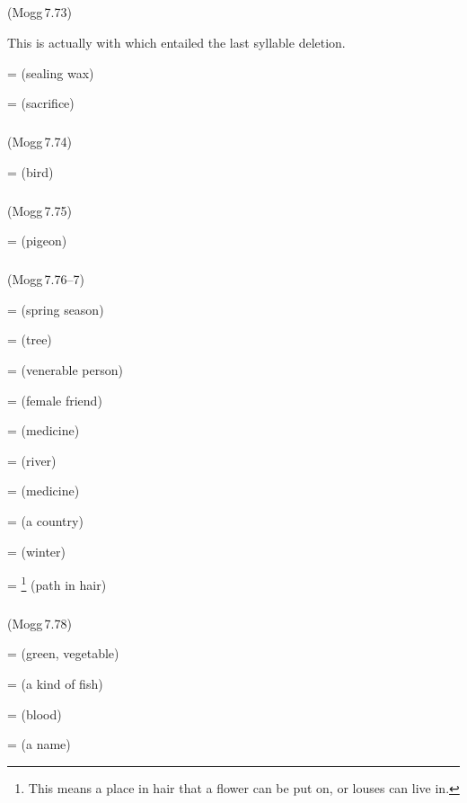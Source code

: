 \subparagraph*{} (Mogg\,7.73)\label{pacckx:ratu}

This is actually  with  which entailed the last syllable deletion.

 =  (sealing wax)\par
{} =  (sacrifice)\par

\subparagraph*{} (Mogg\,7.74)\label{pacckx:unta}

 =  (bird)\par

\subparagraph*{} (Mogg\,7.75)\label{pacckx:ota}

 =  (pigeon)\par

\subparagraph*{} (Mogg\,7.76--7)\label{pacckx:anta}

 =  (spring season)\par
{} =  (tree)\par
{} =  (venerable person)\par
{} =  (female friend)\par
{} =  (medicine)\par
{} =  (river)\par
{} =  (medicine)\par
{} =  (a country)\par
{} =  (winter)\par
{} = \footnote{ This means a place in hair that a flower can be put on, or louses can live in.} (path in hair)\par

\subparagraph*{} (Mogg\,7.78)\label{pacckx:ita}

 =  (green, vegetable)\par
{} =  (a kind of fish)\par
{} =  (blood)\par
{} =  (a name)\par

